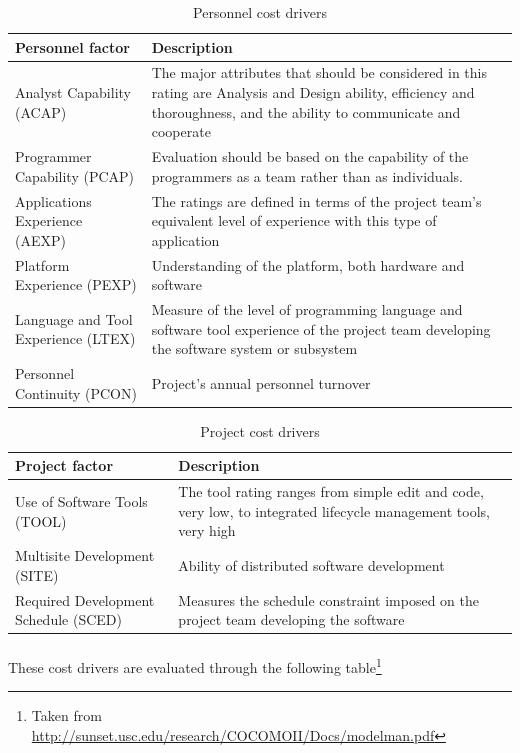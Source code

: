 \begin{table}[H]
\centering
\begin{tabular}{p{} | p{}}
\textbf{Personnel factor} & \textbf{Description}\\ \hline
Analyst Capability (ACAP) & The major attributes that should be considered in this rating are Analysis and Design ability, efficiency and thoroughness, and the ability to communicate and cooperate \\ \hline
Programmer Capability (PCAP) & Evaluation should be based on the capability of the programmers as a team rather than as individuals. \\ \hline
Applications Experience (AEXP) &  The ratings are defined in terms of the project team's equivalent level of experience with this type of application \\ \hline
Platform Experience (PEXP) & Understanding of the platform, both hardware and software \\ \hline
Language and Tool Experience (LTEX) & Measure of the level of programming language and software tool experience of the project team developing the software system or subsystem \\ \hline
Personnel Continuity (PCON) & Project's annual personnel turnover
\end{tabular}
\caption{Personnel cost drivers}
\end{table}

\begin{table}[H]
\centering
\begin{tabular}{p{} | p{}}
\textbf{Project factor} & \textbf{Description}\\ \hline
Use of Software Tools (TOOL) & The tool rating ranges from simple edit and code, very low, to integrated lifecycle management tools, very high\\ \hline
Multisite Development (SITE) & Ability of distributed software development \\ \hline
Required Development Schedule (SCED) & Measures the schedule constraint imposed on the project team developing the software
\end{tabular}
\caption{Project cost drivers}
\end{table}

\paragraph{} These cost drivers are evaluated through the following table\footnote{Taken from \url{http://sunset.usc.edu/research/COCOMOII/Docs/modelman.pdf}}

